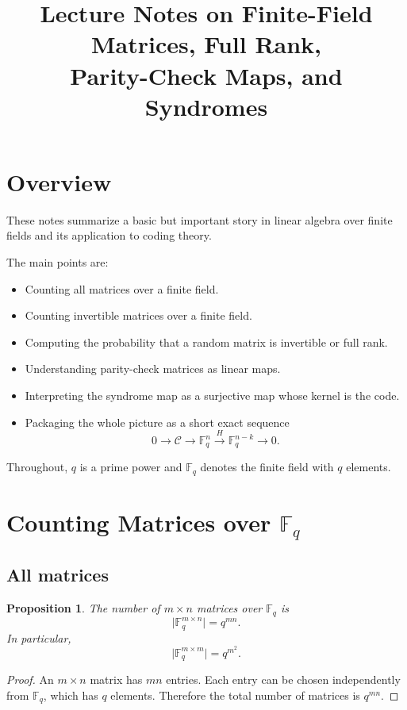 \documentclass[11pt]{article}
\title{Lecture Notes on Finite-Field Matrices, Full Rank,\\
	Parity-Check Maps, and Syndromes}
\author{}
\date{}
\newcommand{\F}{\mathbb{F}}
\newcommand{\cC}{\mathcal{C}}
\theoremstyle{definition}
\theoremstyle{plain}
\newtheorem{proposition}[definition]{Proposition}
\begin{document}
	\maketitle
	
	\tableofcontents
	
	\section{Overview}
	
	These notes summarize a basic but important story in linear algebra over finite fields and its application to coding theory.
	
	The main points are:
	
	\begin{itemize}[leftmargin=2em]
		\item Counting all matrices over a finite field.
		\item Counting invertible matrices over a finite field.
		\item Computing the probability that a random matrix is invertible or full rank.
		\item Understanding parity-check matrices as linear maps.
		\item Interpreting the syndrome map as a surjective map whose kernel is the code.
		\item Packaging the whole picture as a short exact sequence
		\[
		0 \longrightarrow \cC \longrightarrow \F_q^n \xrightarrow{\,H\,} \F_q^{n-k} \longrightarrow 0.
		\]
	\end{itemize}
	
	Throughout, \(q\) is a prime power and \(\F_q\) denotes the finite field with \(q\) elements.
	
	\section{Counting Matrices over \(\F_q\)}
	
	\subsection{All matrices}
	
	\begin{proposition}
		The number of \(m\times n\) matrices over \(\F_q\) is
		\[
		\bigl|\F_q^{m\times n}\bigr| = q^{mn}.
		\]
		In particular,
		\[
		\bigl|\F_q^{m\times m}\bigr| = q^{m^2}.
		\]
	\end{proposition}
	
	\begin{proof}
		An \(m\times n\) matrix has \(mn\) entries. Each entry can be chosen independently from \(\F_q\), which has \(q\) elements. Therefore the total number of matrices is \(q^{mn}\).
	\end{proof}
	
\end{document}
